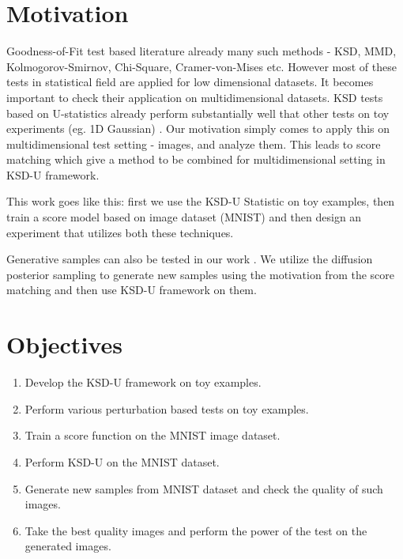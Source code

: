 \documentclass[12pt,a4paper]{report}
\begin{document}
\section{Motivation}
Goodness-of-Fit test based literature already many such methods - KSD, MMD, Kolmogorov-Smirnov, Chi-Square, Cramer-von-Mises etc. However most of these tests in statistical field are applied for low dimensional datasets. It becomes important to check their application on multidimensional datasets. KSD tests based on U-statistics already perform substantially well that other tests on toy experiments (eg. 1D Gaussian) \cite{liu2016kernelizedsteindiscrepancygoodnessoffit}. Our motivation simply comes to apply this on multidimensional test setting - images, and analyze them. This leads to score matching which give a method to be combined for multidimensional setting in KSD-U framework.

\vspace{0.3cm}
\noindent
This work goes like this: first we use the KSD-U Statistic on toy examples, then train a score model based on image dataset (MNIST) and then design an experiment that utilizes both these techniques.

\vspace{0.3cm}
\noindent
Generative samples can also be tested in our work \cite{chung2024diffusionposteriorsamplinggeneral}. We utilize the diffusion posterior sampling to generate new samples using the motivation from the score matching and then use KSD-U framework on them.

\section{Objectives}

\begin{enumerate}
    \item Develop the KSD-U framework on toy examples.
    \item Perform various perturbation based tests on toy examples.
    \item Train a score function on the MNIST image dataset.
    \item Perform KSD-U on the MNIST dataset.
    \item Generate new samples from MNIST dataset and check the quality of such images.
    \item Take the best quality images and perform the power of the test on the generated images.
\end{enumerate}
\end{document}
